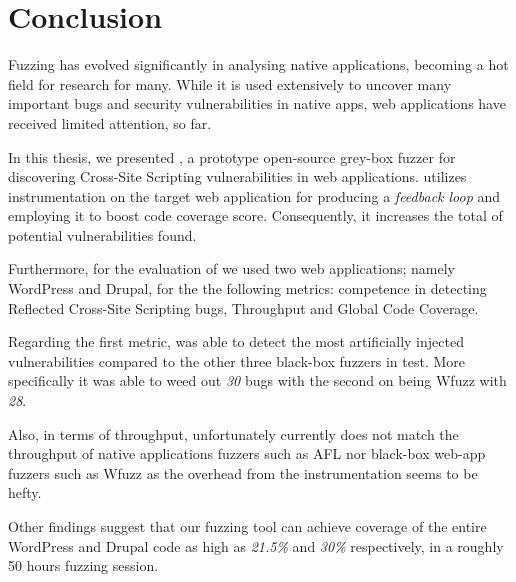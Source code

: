 \chapter{Conclusion}
\label{sec:conclusion}
\vspace*{0.25cm}

Fuzzing has evolved significantly in analysing native applications, becoming a hot field for research for many. While it is used extensively to uncover many important bugs and security vulnerabilities in native apps, web applications have received limited attention, so far.

In this thesis, we presented \pname{}, a prototype open-source grey-box fuzzer for discovering Cross-Site Scripting vulnerabilities in web applications. \pname{} utilizes instrumentation on the target web application for producing a \emph{feedback loop} and employing it to boost code coverage score. Consequently, it increases the total of potential vulnerabilities found.

Furthermore, for the evaluation of \pname{} we used two web applications; namely WordPress and Drupal, for the the following metrics: competence in detecting Reflected Cross-Site Scripting bugs, Throughput and Global Code Coverage.

Regarding the first metric, \pname{} was able to detect the most artificially injected vulnerabilities compared to the other three black-box fuzzers in test. More specifically it was able to weed out \emph{30} bugs with the second on being Wfuzz with \emph{28}.

Also, in terms of throughput, unfortunately currently \pname{} does not match the throughput of native applications fuzzers such as AFL nor black-box web-app fuzzers such as Wfuzz as the overhead from the instrumentation seems to be hefty.

Other findings suggest that our fuzzing tool can achieve coverage of the entire WordPress and Drupal code as high as \emph{21.5\%} and \emph{30\%} respectively, in a roughly 50 hours fuzzing session.


